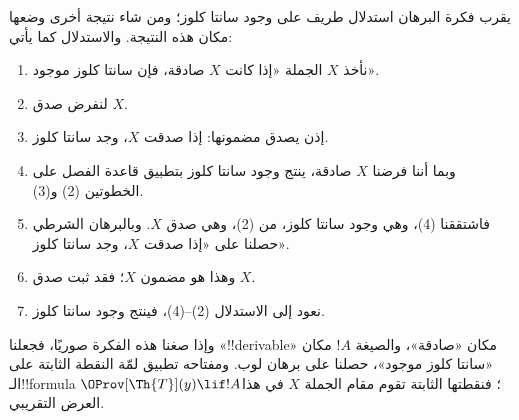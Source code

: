 \documentclass[../../../include/open-logic-section]{subfiles}
\begin{document}
\begin{explain}
يقرب فكرة البرهان استدلال طريف على وجود سانتا كلوز؛ ومن شاء
نتيجة أخرى وضعها مكان هذه النتيجة. والاستدلال كما يأتي:
\begin{enumerate}
\item نأخذ $X$ الجملة «إذا كانت $X$ صادقة، فإن سانتا كلوز موجود».
\item لنفرض صدق $X$.
\item إذن يصدق مضمونها: إذا صدقت $X$، وجد سانتا كلوز.
\item وبما أننا فرضنا $X$ صادقة، ينتج وجود سانتا كلوز بتطبيق
  قاعدة الفصل على الخطوتين (2) و(3).
\item فاشتققنا (4)، وهي وجود سانتا كلوز، من (2)، وهي صدق $X$.
  وبالبرهان الشرطي حصلنا على «إذا صدقت $X$، وجد سانتا كلوز».
\item وهذا هو مضمون $X$؛ فقد ثبت صدق $X$.
\item نعود إلى الاستدلال (2)--(4)، فينتج وجود سانتا كلوز.
\end{enumerate}
وإذا صغنا هذه الفكرة صوريًا، فجعلنا «!!{derivable}» مكان
«صادقة»، والصيغة $!A$ مكان «سانتا كلوز موجود»، حصلنا على برهان
لوب. ومفتاحه تطبيق لمّة النقطة الثابتة على الـ!!{formula}
$\OProv[\Th{T}](y) \lif !A$؛ فنقطتها الثابتة تقوم مقام
الجملة $X$ في هذا العرض التقريبي.
\end{explain}
\end{document}
